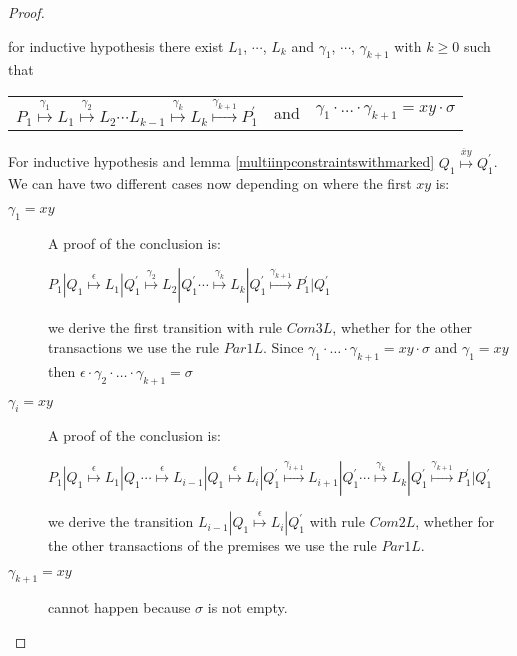 \begin{proposition}
\begin{proof}
\begin{description}
	for inductive hypothesis there exist $L_{1}$, $\cdots$, $L_{k}$ and $\gamma_{1}$, $\cdots$, $\gamma_{k+1}$ with $k\geq 0$ such that 
	\begin{center}
	  \begin{tabular}{lll}
	    $P_{1} \stackrel{\gamma_{1}}{\longmapsto} L_{1}  \stackrel{\gamma_{2}}{\longmapsto} L_{2} \cdots L_{k-1} \stackrel{\gamma_{k}}{\longmapsto} L_{k} \stackrel{\gamma_{k+1}}{\longmapsto} P_{1}^{'}$ 
	  &
	    and
	  &
	    $\gamma_{1} \cdot \ldots \cdot \gamma_{k+1} = xy \cdot \sigma$  
	  \end{tabular}
	\end{center}
	For inductive hypothesis and lemma \ref{multiinpconstraintswithmarked} $Q_{1} \stackrel{\overline{x}y}{\longmapsto} Q_{1}^{'}$. We can have two different cases now depending on where the first $xy$ is:
	\begin{description}
	  \item[$\gamma_{1}=xy$]
	    A proof of the conclusion is:
	    \begin{center}
	      $P_{1}|Q_{1} \stackrel{\epsilon}{\longmapsto} L_{1}|Q_{1}^{'}
			      \stackrel{\gamma_{2}}{\longmapsto} L_{2}|Q_{1}^{'}
		  \cdots
			      \stackrel{\gamma_{k}}{\longmapsto} L_{k}|Q_{1}^{'}
			      \stackrel{\gamma_{k+1}}{\longmapsto} P_{1}^{'}|Q_{1}^{'}$	  
	    \end{center}
	    we derive the first transition with rule $Com3L$, whether for the other transactions we use the rule $Par1L$. Since $\gamma_{1} \cdot \ldots \cdot \gamma_{k+1} = xy \cdot \sigma$ and $\gamma_{1}=xy$ then $\epsilon \cdot \gamma_{2}\cdot \ldots \cdot \gamma_{k+1}=\sigma$
	  \item[$\gamma_{i}=xy$]
	    A proof of the conclusion is:
	    \begin{center}
	      $P_{1}|Q_{1} \stackrel{\epsilon}{\longmapsto} L_{1}|Q_{1} 
		  \cdots
			      \stackrel{\epsilon}{\longmapsto} L_{i-1}|Q_{1} 
			      \stackrel{\epsilon}{\longmapsto} L_{i}|Q_{1}^{'}
			      \stackrel{\gamma_{i+1}}{\longmapsto} L_{i+1}|Q_{1}^{'}
		  \cdots 
			      \stackrel{\gamma_{k}}{\longmapsto} L_{k}|Q_{1}^{'}
			      \stackrel{\gamma_{k+1}}{\longmapsto} P_{1}^{'}|Q_{1}^{'}$	  
	    \end{center}
	    we derive the transition $ L_{i-1}|Q_{1} \stackrel{\epsilon}{\longmapsto} L_{i}|Q_{1}^{'}$ with rule $Com2L$, whether for the other transactions of the premises we use the rule $Par1L$.
	  \item[$\gamma_{k+1}=xy$] cannot happen because $\sigma$ is not empty.
	\end{description}
    \end{description}
  \end{proof}
\end{proposition}






